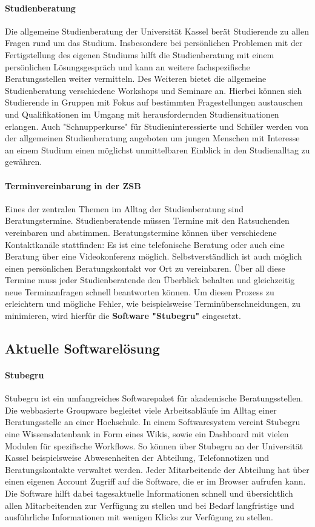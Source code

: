 \documentclass[12pt]{article}
\begin{document}
\paragraph{Studienberatung}
Die allgemeine Studienberatung der Universität Kassel berät Studierende zu
allen Fragen rund um das Studium. Insbesondere bei persönlichen Problemen mit
der Fertigstellung des eigenen Studiums hilft die Studienberatung mit einem
persönlichen Lösungsgespräch und kann an weitere fachspezifische
Beratungsstellen weiter vermitteln. Des Weiteren bietet die allgemeine
Studienberatung verschiedene Workshops und Seminare an. Hierbei können sich
Studierende in Gruppen mit Fokus auf bestimmten Fragestellungen austauschen und
Qualifikationen im Umgang mit herausfordernden Studiensituationen erlangen.
Auch "Schnupperkurse" für Studieninteressierte und Schüler werden von der
allgemeinen Studienberatung angeboten um jungen Menschen mit Interesse an einem
Studium einen möglichst unmittelbaren Einblick in den Studienalltag zu
gewähren.\cite{studBeratungKsWeb}

\paragraph{Terminvereinbarung in der ZSB}
Eines der zentralen Themen im Alltag der Studienberatung sind Beratungstermine.
 Studienberatende müssen Termine mit den Ratsuchenden
vereinbaren und abstimmen. Beratungstermine können über verschiedene
Kontaktkanäle stattfinden: Es ist eine telefonische Beratung oder auch eine
Beratung über eine Videokonferenz möglich. Selbstverständlich ist auch möglich
einen persönlichen Beratungskontakt vor Ort zu vereinbaren. Über all diese
Termine muss jeder Studienberatende den Überblick behalten und gleichzeitig
neue Terminanfragen schnell beantworten können. Um diesen Prozess zu
erleichtern und mögliche Fehler, wie beispielsweise Terminüberschneidungen, zu
minimieren, wird hierfür die \textbf{Software "Stubegru"} eingesetzt.

\subsection{Aktuelle Softwarelösung}
\paragraph{Stubegru}
Stubegru ist ein umfangreiches Softwarepaket für akademische Beratungsstellen.
Die webbasierte Groupware begleitet viele Arbeitsabläufe im Alltag einer
Beratungsstelle an einer Hochschule. In einem Softwaresystem vereint Stubegru
eine Wissensdatenbank in Form eines Wikis, sowie ein Dashboard mit vielen
Modulen für spezifische Workflows. So können über Stubegru an der Universität
Kassel beispielsweise Abwesenheiten der Abteilung, Telefonnotizen und
Beratungskontakte verwaltet werden. Jeder Mitarbeitende der Abteilung hat über
einen eigenen Account Zugriff auf die Software, die er im Browser aufrufen
kann. Die Software hilft dabei tagesaktuelle Informationen schnell und
übersichtlich allen Mitarbeitenden zur Verfügung zu stellen und bei Bedarf
langfristige und ausführliche Informationen mit wenigen Klicks zur Verfügung zu
stellen.\cite{stubegruWebsite}
\end{document}
